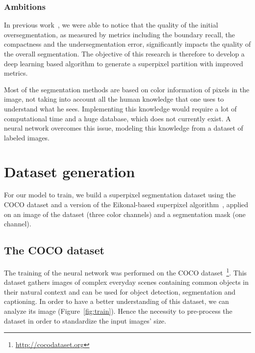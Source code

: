\documentclass{article}
\begin{document}
        \subsubsection{Ambitions}
            In previous work~\cite{chang2019}, we were able to notice that the quality of the initial oversegmentation, as measured by metrics including the boundary recall, the compactness and the undersegmentation error, significantly impacts the quality of the overall segmentation. The objective of this research is therefore to develop a deep learning based algorithm to generate a superpixel partition with improved metrics.
            \par
            Most of the segmentation methods are based on color information of pixels in the image, not taking into account all the human knowledge that one uses to understand what he sees. Implementing this knowledge would require a lot of computational time and a huge database, which does not currently exist. A neural network overcomes this issue, modeling this knowledge from a dataset of labeled images.


\section{Dataset generation}
    For our model to train, we build a superpixel segmentation dataset using the COCO dataset and a version of the Eikonal-based superpixel algorithm~\cite{figliuzzi2019}, applied on an image of the dataset (three color channels) and a segmentation mask (one channel).

    \subsection{The COCO dataset}
        \label{par:coco}
        The training of the neural network was performed on the COCO dataset~\cite{microsoft2014}\footnote{\url{http://cocodataset.org}}. This dataset gathers images of complex everyday scenes containing common objects in their natural context and can be used for object detection, segmentation and captioning. In order to have a better understanding of this dataset, we can analyze its image (Figure~\ref{fig:train}). Hence the necessity to pre-process the dataset in order to standardize the input images' size.
\end{document}
